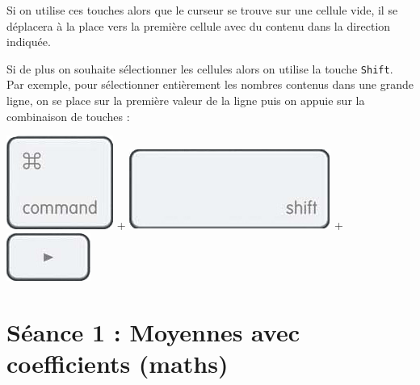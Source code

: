 Si on utilise ces touches alors que le curseur se trouve sur une cellule vide, il se déplacera à la place vers la première cellule avec du contenu dans la direction indiquée.

Si de plus on souhaite sélectionner les cellules alors on utilise la touche \texttt{Shift}. Par exemple, pour sélectionner entièrement les nombres contenus dans une grande ligne, on se place sur la première valeur de la ligne puis on appuie sur la combinaison de touches :

\begin{center}
\includegraphics[scale=1.5]{./images/tableur03/clavierCmd}  + \includegraphics[scale=1.5]{./images/tableur03/clavierShift} + \includegraphics[scale=1.5]{./images/tableur03/clavierRight}
\end{center}



%
%
%
%

\newpage

\section{Séance 1 : Moyennes avec coefficients (maths)}\label{ficheTableur4e1}

